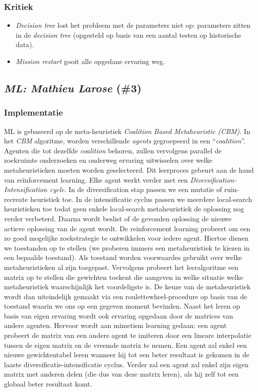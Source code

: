 \subsubsection{Kritiek}
\begin{itemize}
 \item \emph{Decision tree} lost het probleem met de parameters niet op: parameters zitten in de \emph{decision tree} (opgesteld op basis van een aantal testen op historische data).
 \item \emph{Mission restart} gooit alle opgedane ervaring weg.
\end{itemize}
\subsection{\emph{ML: Mathieu Larose} (\#3)}
\label{sss:ml}
\subsubsection{Implementatie}
ML\cite{chesc-ml} is gebaseerd op de meta-heuristiek \emph{Coalition Based Metaheuristic (CBM)}\cite{chesc-ml2}. In het \emph{CBM} algoritme, worden verschillende \emph{agents} gegroepeerd in een ``\emph{coalition}''. Agenten die tot dezelfde \emph{coalition} behoren, zullen vervolgens parallel de zoekruimte onderzoeken en onderweg ervaring uitwisselen over welke metaheuristieken moeten worden geselecteerd. Dit leerproces gebeurt aan de hand van re\"inforcement learning. Elke agent werkt verder met een \emph{Diversification-Intensification cycle}. In de diversification stap passen we een mutatie of ruin-recreate heuristiek toe. In de intensificatie cyclus passen we meerdere local-search heuristieken toe todat geen enkele local-search metaheuristiek de oplossing nog verder verbeterd. Daarna wordt beslist of de gevonden oplossing de nieuwe actieve oplossing van de agent wordt. De reinforcement learning probeert om een zo goed mogelijke zoekstrategie te ontwikkelen voor iedere agent. Hiertoe dienen we toestanden op te stellen (we proberen immers een metaheuristiek te kiezen in een bepaalde toestand). Als toestand worden voorwaardes gebruikt over welke metaheuristieken al zijn toegepast. Vervolgens probeert het leeralgoritme een matrix op te stellen die gewichten toekent die aangeven in welke situatie welke metaheuristiek waarschijnlijk het voordeligste is. De keuze van de metaheuristiek wordt dan uiteindelijk gemaakt via een roulettewheel-procedure op basis van de toestand waarin we ons op een gegeven moment bevinden. Naast het leren op basis van eigen ervaring wordt ook ervaring opgedaan door de matrices van andere agenten. Hervoor wordt aan mimetism learning gedaan: een agent probeert de matrix van een andere agent te imiteren door een lineare interpolatie tussen de eigen matrix en de vreemde matrix te nemen. Een agent zal enkel een nieuwe gewichtentabel leren wanneer hij tot een beter resultaat is gekomen in de laaste diversificatie-intensificatie cyclus. Verder zal een agent zal enkel zijn eigen matrix met anderen delen (die dus van deze matrix leren), als hij zelf tot een globaal beter resultaat komt.
